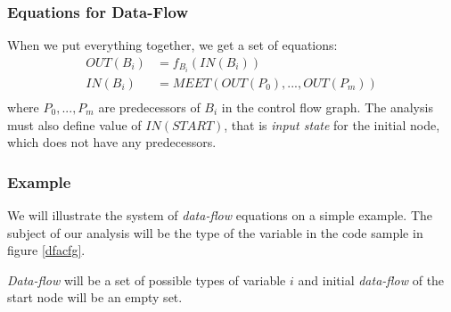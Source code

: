         \subsubsection*{Equations for Data-Flow}
        
        When we put everything together, we get a set of equations:
        \begin{align*}
            OUT(B_i) &= f_{B_i}(IN(B_i)) \\
            IN(B_i) &= \mathit{MEET}(OUT(P_0), ..., OUT(P_m)) \\ 
        \end{align*}
        where $P_0, ..., P_m$ are predecessors of $B_i$ in the 
        control flow graph. The analysis must also define value 
        of $IN(START)$, that is \emph{input state} for the 
        initial node, which does not have any predecessors.
        
        \subsubsection*{Example}
        We will illustrate the system of \emph{data-flow} equations on a 
        simple example. The subject of our analysis will be the 
        type of the variable  in the code sample in figure \ref{dfacfg}.
        
        \emph{Data-flow} will be a set of possible types of variable $i$ and 
        initial \emph{data-flow} of the start node will be an empty set.

